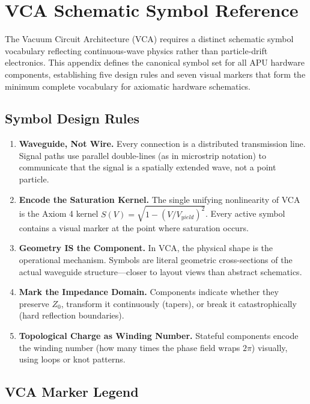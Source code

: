 \chapter{VCA Schematic Symbol Reference}
\label{app:vca_symbols}

The Vacuum Circuit Architecture (VCA) requires a distinct schematic symbol vocabulary reflecting continuous-wave physics rather than particle-drift electronics. This appendix defines the canonical symbol set for all APU hardware components, establishing five design rules and seven visual markers that form the minimum complete vocabulary for axiomatic hardware schematics.

\section{Symbol Design Rules}

\begin{enumerate}
    \item \textbf{Waveguide, Not Wire.} Every connection is a distributed transmission line. Signal paths use parallel double-lines (as in microstrip notation) to communicate that the signal is a spatially extended wave, not a point particle.
    
    \item \textbf{Encode the Saturation Kernel.} The single unifying nonlinearity of VCA is the Axiom 4 kernel $S(V) = \sqrt{1 - (V/V_{yield})^2}$. Every active symbol contains a visual marker at the point where saturation occurs.
    
    \item \textbf{Geometry IS the Component.} In VCA, the physical shape is the operational mechanism. Symbols are literal geometric cross-sections of the actual waveguide structure---closer to layout views than abstract schematics.
    
    \item \textbf{Mark the Impedance Domain.} Components indicate whether they preserve $Z_0$, transform it continuously (tapers), or break it catastrophically (hard reflection boundaries).
    
    \item \textbf{Topological Charge as Winding Number.} Stateful components encode the winding number (how many times the phase field wraps $2\pi$) visually, using loops or knot patterns.
\end{enumerate}

\section{VCA Marker Legend}

